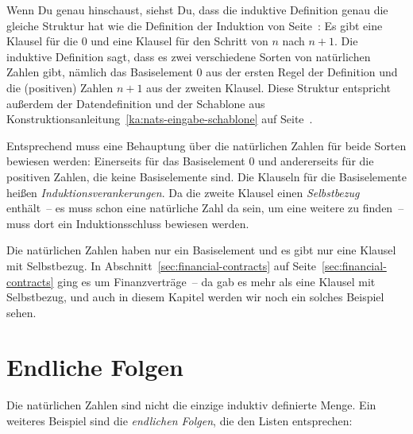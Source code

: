 Wenn Du genau hinschaust, siehst Du, dass die induktive Definition genau die
gleiche Struktur hat wie die Definition der Induktion von
Seite~\pageref{page:mathematical-induction}: Es gibt eine Klausel für
die $0$ und eine Klausel für den Schritt von $n$ nach $n+1$.  Die induktive
Definition sagt, dass es zwei verschiedene Sorten von natürlichen
Zahlen gibt, nämlich das Basiselement $0$ aus der ersten Regel der
Definition und die (positiven) Zahlen $n+1$ aus der zweiten Klausel.
Diese Struktur entspricht außerdem der Datendefinition und der Schablone aus
Konstruktionsanleitung~\ref{ka:nats-eingabe-schablone} auf
Seite~\pageref{ka:nats-eingabe-schablone}.

Entsprechend muss eine Behauptung über die natürlichen Zahlen für beide
Sorten bewiesen werden: Einerseits für das Basiselement $0$ und
andererseits für die positiven Zahlen, die keine Basiselemente sind.
Die Klauseln für die Basiselemente heißen
\textit{Induktionsverankerungen}.  Da die
zweite Klausel einen \textit{Selbstbezug}
enthält~-- es muss schon eine natürliche Zahl da sein, um eine weitere
zu finden~-- muss dort ein Induktionsschluss bewiesen werden.

Die natürlichen Zahlen haben nur ein Basiselement und es gibt nur eine
Klausel mit Selbstbezug.  In Abschnitt~\ref{sec:financial-contracts} auf
Seite~\ref{sec:financial-contracts} ging es um Finanzverträge~-- da
gab es mehr als eine Klausel mit Selbstbezug, und auch in diesem
Kapitel werden wir noch ein solches Beispiel sehen.

\section{Endliche Folgen}
\label{sec:finite-sequences}

Die natürlichen Zahlen sind nicht die einzige induktiv definierte
Menge.  Ein weiteres Beispiel sind die \textit{endlichen Folgen}, die den Listen entsprechen:

